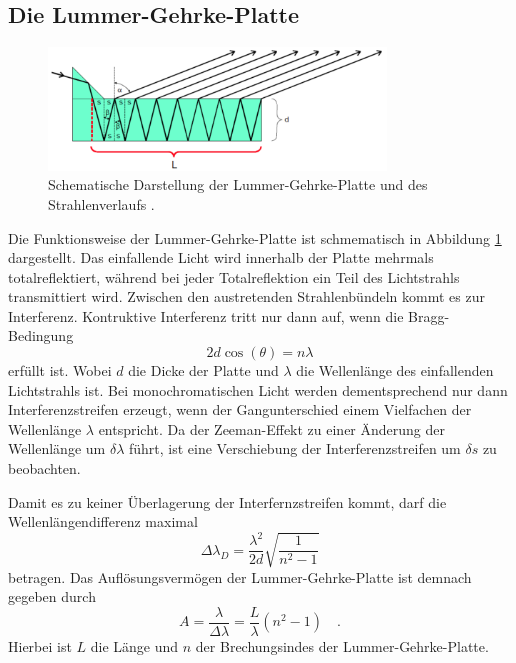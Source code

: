 \subsection*{Die Lummer-Gehrke-Platte}
\FloatBarrier
\begin{figure}
\centering
\includegraphics[width=0.8\textwidth]{dieguteGehrke.png}
\caption{Schematische Darstellung der Lummer-Gehrke-Platte und des Strahlenverlaufs \cite{quelle02}.}
\label{fig:tfig6}
\end{figure}
\FloatBarrier
Die Funktionsweise der Lummer-Gehrke-Platte ist schmematisch in Abbildung \ref{fig:tfig6} dargestellt. Das einfallende Licht wird innerhalb der Platte mehrmals totalreflektiert,
während bei jeder Totalreflektion ein Teil des Lichtstrahls transmittiert wird. Zwischen den austretenden Strahlenbündeln kommt es zur Interferenz. Kontruktive Interferenz tritt nur dann
auf, wenn die Bragg-Bedingung
\begin{equation}
2d \cos(\theta) = n \lambda
\end{equation}
erfüllt ist. Wobei $d$ die Dicke der Platte und $\lambda$ die Wellenlänge des einfallenden Lichtstrahls ist.
Bei monochromatischen Licht werden dementsprechend nur dann Interferenzstreifen erzeugt, wenn der Gangunterschied einem Vielfachen der Wellenlänge $\lambda$ entspricht. Da der Zeeman-Effekt zu einer 
Änderung der Wellenlänge um $\delta \lambda$ führt, ist eine Verschiebung der Interferenzstreifen um $\delta s$ zu beobachten.

Damit es zu keiner Überlagerung der Interfernzstreifen kommt, darf die Wellenlängendifferenz maximal
\begin{equation}
\Delta \lambda_D = \frac{\lambda ^2}{2d}\sqrt{\frac{1}{n^2-1}}
\end{equation}
betragen. Das Auflösungsvermögen der Lummer-Gehrke-Platte ist demnach gegeben durch
\begin{equation}
A = \frac{\lambda}{\Delta \lambda} = \frac{L}{\lambda}(n^2-1) \quad  .
\end{equation}
Hierbei ist $L$ die Länge und $n$ der Brechungsindes der Lummer-Gehrke-Platte.


